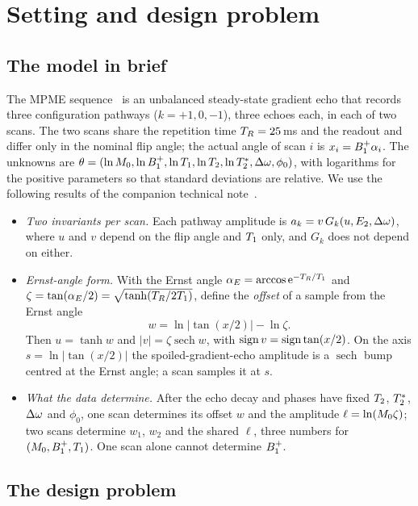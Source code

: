 \section{Setting and design problem}\label{sec:setting}

\subsection{The model in brief}

The MPME sequence~\cite{cheng2019} is an unbalanced steady-state gradient echo that records
three configuration pathways ($k=+1,0,-1$), three echoes each, in each of two scans. The two
scans share the repetition time $T_R=25$\,ms and the readout and differ only in the nominal flip
angle; the actual angle of scan $i$ is $x_i=B_1^{+}\alpha_i$. The unknowns are
$\theta=(\ln M_0,\ln B_1^{+},\ln T_1,\ln T_2,\ln T_2^{*},\Delta\omega,\phi_0)$, with logarithms for the positive
parameters so that standard deviations are relative. We use the following results of the
companion technical note~\cite{technote}.

\begin{itemize}
\item \emph{Two invariants per scan.} Each pathway amplitude is $a_k=v\,G_k(u,E_2,\Delta\omega)$, where
  $u$ and $v$ depend on the flip angle and $T_1$ only, and $G_k$ does not depend on either.
\item \emph{Ernst-angle form.} With the Ernst angle $\alpha_E=\arccos\mathrm{e}^{-T_R/T_1}$ and
  $\zeta=\tan(\alpha_E/2)=\sqrt{\tanh(T_R/2T_1)}$, define the \emph{offset} of a sample from the Ernst angle
  \begin{equation}
    w=\ln|\tan(x/2)|-\ln\zeta .
    \label{eq:w}
  \end{equation}
  Then $u=\tanh w$ and $|v|=\zeta\operatorname{sech}w$, with $\operatorname{sign} v=\operatorname{sign}\tan(x/2)$. On the axis
  $s=\ln|\tan(x/2)|$ the spoiled-gradient-echo amplitude is a $\operatorname{sech}$ bump centred at the
  Ernst angle; a scan samples it at $s$.
\item \emph{What the data determine.} After the echo decay and phases have fixed $T_2$, $T_2^{*}$,
  $\Delta\omega$ and $\phi_0$, one scan determines its offset $w$ and the amplitude $\ell=\ln(M_0\zeta)$; two
  scans determine $w_1$, $w_2$ and the shared $\ell$, three numbers for $(M_0,B_1^{+},T_1)$. One scan
  alone cannot determine $B_1^{+}$.
\end{itemize}

\subsection{The design problem}\label{sec:problem}

